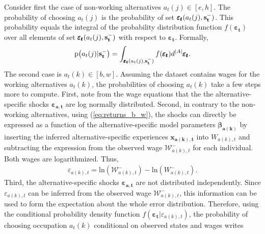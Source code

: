 \documentclass[a4paper,12pt]{article}
\begin{document}
Consider first the case of non-working alternatives $a_t(j) \in [e,h]$. The probability of choosing $a_t(j)$ is the probability of set $\pmb{\varepsilon_t}(a_t(j),\bold{s_t^-})$. This probability equals the integral of the probability distribution function $f(\pmb{\varepsilon_t})$ over all elements of set $\pmb{\varepsilon_t}(a_t(j),\bold{s_t^-})$ with respect to $\pmb{\varepsilon_t}$. Formally,
\begin{align}
\text{p}\big(a_t(j) | \bold{s_t^-}\big) = \int_{\pmb{\varepsilon_t}(a_t(j),\bold{s_t^-})} f(\pmb{\varepsilon_t}) d^{|A|} \pmb{\varepsilon_t}.
\end{align}
\noindent
The second case is $a_t(k) \in [b,w]$. Assuming the dataset contains wages for the working alternatives $a_t(k)$, the probabilities of choosing $a_t(k)$ take a few steps more to compute. First, note from the wage equations that the the alternative-specific shocks $\pmb{\varepsilon_{a,t}}$ are log normally distributed. Second, in contrary to the non-working alternatives, using (\ref{eq:returns_b_w}), the shocks can directly be expressed as a function of the alternative-specific model parameters $\pmb{\beta_{a(k)}}$ by inserting the inferred alternative-specific experiences $\pmb{x_{a(k),t}}$ into $W_{a(k),t}$ and subtracting the expression from the observed wage $\mathcal{W}^{-}_{a(k),t}$ for each individual. Both wages are logarithmized. Thus,
\begin{align} \label{eq:epsilon}
\varepsilon_{a(k),t} = \text{ln}(\mathcal{W}^{-}_{a(k),t}) - \text{ln}(W_{a(k),t}^{-}).
\end{align}
Third, the alternative-specific shocks $\pmb{\varepsilon_{a,t}}$ are not distributed independently. Since $\varepsilon_{a(k),t}$ can be inferred from the
observed wage $\mathcal{W}^{-}_{a(k),t}$, this information can be used to form the expectation about the whole error distribution. Therefore, using the conditional probability density function $f(\pmb{\varepsilon_t}|\varepsilon_{a(k),t})$, the probability of choosing occupation $a_t(k)$ conditional on observed states and wages writes
\end{document}

